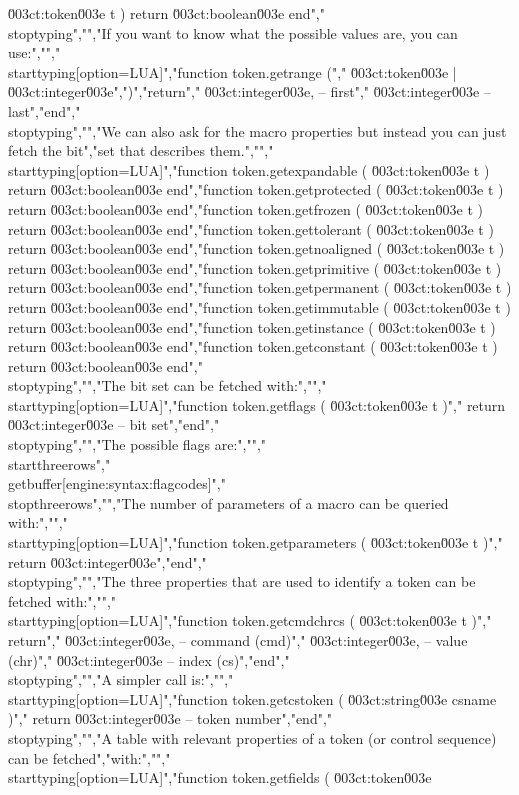 \u003ct:token\u003e t ) return \u003ct:boolean\u003e end","\\stoptyping","","If you want to know what the possible values are, you can use:","","\\starttyping[option=LUA]","function token.getrange (","    \u003ct:token\u003e | \u003ct:integer\u003e",")","return","    \u003ct:integer\u003e, -- first","    \u003ct:integer\u003e  -- last","end","\\stoptyping","","We can also ask for the macro properties but instead you can just fetch the bit","set that describes them.","","\\starttyping[option=LUA]","function token.getexpandable ( \u003ct:token\u003e t ) return \u003ct:boolean\u003e end","function token.getprotected  ( \u003ct:token\u003e t ) return \u003ct:boolean\u003e end","function token.getfrozen     ( \u003ct:token\u003e t ) return \u003ct:boolean\u003e end","function token.gettolerant   ( \u003ct:token\u003e t ) return \u003ct:boolean\u003e end","function token.getnoaligned  ( \u003ct:token\u003e t ) return \u003ct:boolean\u003e end","function token.getprimitive  ( \u003ct:token\u003e t ) return \u003ct:boolean\u003e end","function token.getpermanent  ( \u003ct:token\u003e t ) return \u003ct:boolean\u003e end","function token.getimmutable  ( \u003ct:token\u003e t ) return \u003ct:boolean\u003e end","function token.getinstance   ( \u003ct:token\u003e t ) return \u003ct:boolean\u003e end","function token.getconstant   ( \u003ct:token\u003e t ) return \u003ct:boolean\u003e end","\\stoptyping","","The bit set can be fetched with:","","\\starttyping[option=LUA]","function token.getflags ( \u003ct:token\u003e t )","    return \u003ct:integer\u003e -- bit set","end","\\stoptyping","","The possible flags are:","","\\startthreerows","\\getbuffer[engine:syntax:flagcodes]","\\stopthreerows","","The number of parameters of a macro can be queried with:","","\\starttyping[option=LUA]","function token.getparameters ( \u003ct:token\u003e t )","    return \u003ct:integer\u003e","end","\\stoptyping","","The three properties that are used to identify a token can be fetched with:","","\\starttyping[option=LUA]","function token.getcmdchrcs ( \u003ct:token\u003e t )","    return","        \u003ct:integer\u003e, -- command (cmd)","        \u003ct:integer\u003e, -- value   (chr)","        \u003ct:integer\u003e  -- index   (cs)","end","\\stoptyping","","A simpler call is:","","\\starttyping[option=LUA]","function token.getcstoken ( \u003ct:string\u003e csname )","    return \u003ct:integer\u003e -- token number","end","\\stoptyping","","A table with relevant properties of a token (or control sequence) can be fetched","with:","","\\starttyping[option=LUA]","function token.getfields ( \u003ct:token\u003e 